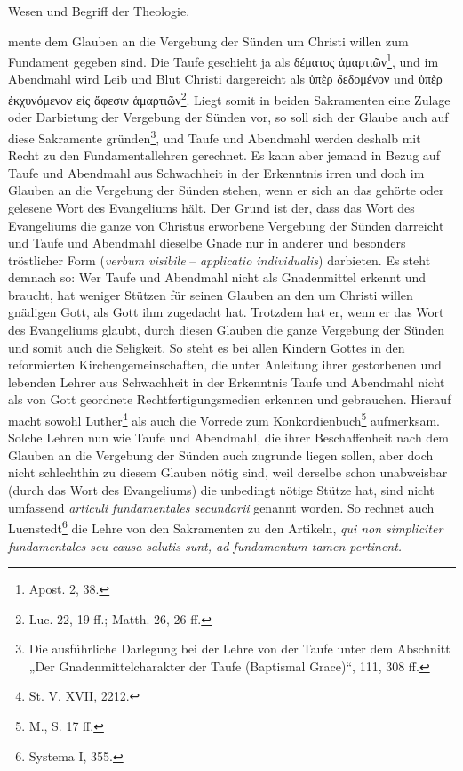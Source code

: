 \setcounter{page}{96}
\pagestyle{empty}
\hfill Wesen und Begriff der Theologie.\par
\vspace{\baselineskip}

mente dem Glauben an die Vergebung der Sünden um Christi willen zum Fundament gegeben sind. Die Taufe geschieht ja als δέματος ἁμαρτιῶν\footnote[349]{Apost. 2, 38.}, und im Abendmahl wird Leib und Blut Christi dargereicht als ὑπὲρ δεδομένον und ὑπὲρ ἐκχυνόμενον εἰς ἄφεσιν ἁμαρτιῶν\footnote[350]{Luc. 22, 19 ff.; Matth. 26, 26 ff.}. Liegt somit in beiden Sakramenten eine Zulage oder Darbietung der Vergebung der Sünden vor, so soll sich der Glaube auch auf diese Sakramente gründen\footnote[351]{Die ausführliche Darlegung bei der Lehre von der Taufe unter dem Abschnitt „Der Gnadenmittelcharakter der Taufe (Baptismal Grace)“, 111, 308 ff.}, und Taufe und Abendmahl werden deshalb mit Recht zu den Fundamentallehren gerechnet. Es kann aber jemand in Bezug auf Taufe und Abendmahl aus Schwachheit in der Erkenntnis irren und doch im Glauben an die Vergebung der Sünden stehen, wenn er sich an das gehörte oder gelesene Wort des Evangeliums hält. Der Grund ist der, dass das Wort des Evangeliums die ganze von Christus erworbene Vergebung der Sünden darreicht und Taufe und Abendmahl dieselbe Gnade nur in anderer und besonders tröstlicher Form (\emph{verbum visibile} – \emph{applicatio individualis}) darbieten. Es steht demnach so: Wer Taufe und Abendmahl nicht als Gnadenmittel erkennt und braucht, hat weniger Stützen für seinen Glauben an den um Christi willen gnädigen Gott, als Gott ihm zugedacht hat. Trotzdem hat er, wenn er das Wort des Evangeliums glaubt, durch diesen Glauben die ganze Vergebung der Sünden und somit auch die Seligkeit. So steht es bei allen Kindern Gottes in den reformierten Kirchengemeinschaften, die unter Anleitung ihrer gestorbenen und lebenden Lehrer aus Schwachheit in der Erkenntnis Taufe und Abendmahl nicht als von Gott geordnete Rechtfertigungsmedien erkennen und gebrauchen. Hierauf macht sowohl Luther\footnote[352]{St. V. XVII, 2212.} als auch die Vorrede zum Konkordienbuch\footnote[353]{M., S. 17 ff.} aufmerksam. Solche Lehren nun wie Taufe und Abendmahl, die ihrer Beschaffenheit nach dem Glauben an die Vergebung der Sünden auch zugrunde liegen sollen, aber doch nicht schlechthin zu diesem Glauben nötig sind, weil derselbe schon unabweisbar (durch das Wort des Evangeliums) die unbedingt nötige Stütze hat, sind nicht umfassend \emph{articuli fundamentales secundarii} genannt worden. So rechnet auch Luenstedt\footnote[354]{Systema I, 355.} die Lehre von den Sakramenten zu den Artikeln, \emph{qui non simpliciter fundamentales seu causa salutis sunt, ad fundamentum tamen pertinent.}\footnotemark[355]
